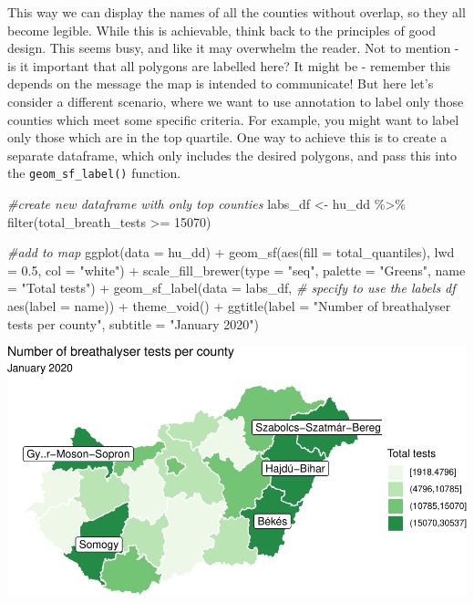 \documentclass[
]{book}
\makeatletter
\newenvironment{Shaded}{\begin{snugshade}}{\end{snugshade}}
\newcommand{\AttributeTok}[1]{\textcolor[rgb]{0.61,0.61,0.61}{#1}}
\newcommand{\CommentTok}[1]{\textcolor[rgb]{0.37,0.37,0.37}{\textit{#1}}}
\newcommand{\DecValTok}[1]{\textcolor[rgb]{0.06,0.06,0.06}{#1}}
\newcommand{\FloatTok}[1]{\textcolor[rgb]{0.06,0.06,0.06}{#1}}
\newcommand{\FunctionTok}[1]{\textcolor[rgb]{0,0,0}{#1}}
\newcommand{\NormalTok}[1]{#1}
\newcommand{\OtherTok}[1]{\textcolor[rgb]{0.37,0.37,0.37}{#1}}
\newcommand{\SpecialCharTok}[1]{\textcolor[rgb]{0,0,0}{#1}}
\newcommand{\StringTok}[1]{\textcolor[rgb]{0.5,0.5,0.5}{#1}}
\newenvironment{kframe}{%
\medskip{}
\setlength{\fboxsep}{.8em}
 \def\at@end@of@kframe{}%
 \ifinner\ifhmode%
  \def\at@end@of@kframe{\end{minipage}}%
  \begin{minipage}{\columnwidth}%
 \fi\fi%
 \def\FrameCommand##1{\hskip\@totalleftmargin \hskip-\fboxsep
 \colorbox{shadecolor}{##1}\hskip-\fboxsep
     \hskip-\linewidth \hskip-\@totalleftmargin \hskip\columnwidth}%
 \MakeFramed {\advance\hsize-\width
   \@totalleftmargin\z@ \linewidth\hsize
   \@setminipage}}%
 {\par\unskip\endMakeFramed%
 \at@end@of@kframe}
\renewenvironment{Shaded}{\begin{kframe}}{\end{kframe}}
\makeatother
\begin{document}
This way we can display the names of all the counties without overlap, so they all become legible. While this is achievable, think back to the principles of good design. This seems busy, and like it may overwhelm the reader. Not to mention - is it important that all polygons are labelled here? It might be - remember this depends on the message the map is intended to communicate! But here let's consider a different scenario, where we want to use annotation to label only those counties which meet some specific criteria. For example, you might want to label only those which are in the top quartile. One way to achieve this is to create a separate dataframe, which only includes the desired polygons, and pass this into the \texttt{geom\_sf\_label()} function.

\begin{Shaded}
\begin{Highlighting}[]
\CommentTok{\#create new dataframe with only top counties}
\NormalTok{labs\_df }\OtherTok{\textless{}{-}}\NormalTok{ hu\_dd }\SpecialCharTok{\%\textgreater{}\%} \FunctionTok{filter}\NormalTok{(total\_breath\_tests }\SpecialCharTok{\textgreater{}=} \DecValTok{15070}\NormalTok{)}

\CommentTok{\#add to map}
\FunctionTok{ggplot}\NormalTok{(}\AttributeTok{data =}\NormalTok{ hu\_dd) }\SpecialCharTok{+} 
  \FunctionTok{geom\_sf}\NormalTok{(}\FunctionTok{aes}\NormalTok{(}\AttributeTok{fill =}\NormalTok{ total\_quantiles), }
          \AttributeTok{lwd =} \FloatTok{0.5}\NormalTok{, }\AttributeTok{col =} \StringTok{"white"}\NormalTok{) }\SpecialCharTok{+} 
  \FunctionTok{scale\_fill\_brewer}\NormalTok{(}\AttributeTok{type =} \StringTok{"seq"}\NormalTok{, }
                    \AttributeTok{palette =} \StringTok{"Greens"}\NormalTok{, }
                    \AttributeTok{name =} \StringTok{"Total tests"}\NormalTok{) }\SpecialCharTok{+} 
  \FunctionTok{geom\_sf\_label}\NormalTok{(}\AttributeTok{data =}\NormalTok{ labs\_df, }\CommentTok{\# specify to use the labels df}
                \FunctionTok{aes}\NormalTok{(}\AttributeTok{label =}\NormalTok{ name)) }\SpecialCharTok{+} 
  \FunctionTok{theme\_void}\NormalTok{() }\SpecialCharTok{+} 
  \FunctionTok{ggtitle}\NormalTok{(}\AttributeTok{label =} \StringTok{"Number of breathalyser tests per county"}\NormalTok{, }
          \AttributeTok{subtitle =} \StringTok{"January 2020"}\NormalTok{)}
\end{Highlighting}
\end{Shaded}

\includegraphics{crime_mapping_files/figure-latex/addcountynamestoponly-1.pdf}
\end{document}

